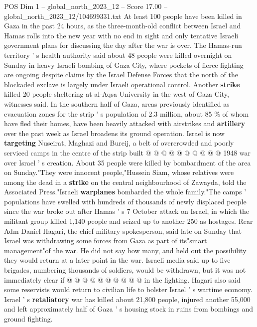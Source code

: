 \begin{textsample}{POS Dim 1 – global\_north\_2023\_12 – Score 17.00 – global\_north\_2023\_12/104699331.txt}  \label{ex:f1_pos_259}
At least 100 people have been killed in Gaza in the past 24 hours, as the three-month-old conflict between Israel and Hamas rolls into the new year with no end in sight and only tentative Israeli government plans for discussing the day after the war is over.
The Hamas-run territory ' s health authority said about 48 people were killed overnight on Sunday in heavy Israeli bombing of Gaza City, where pockets of fierce fighting are ongoing despite claims by the Israel Defense Forces that the north of the blockaded exclave is largely under Israeli operational control.
Another \textbf{strike} killed 20 people sheltering at al-Aqsa University in the west of Gaza City, witnesses said.
In the southern half of Gaza, areas previously identified as evacuation zones for the strip ' s population of 2.3 million, about 85 \% of whom have fled their homes, have been heavily attacked with airstrikes and \textbf{artillery} over the past week as Israel broadens its ground operation.
Israel is now \textbf{targeting} Nuseirat, Maghazi and Bureij, a belt of overcrowded and poorly serviced camps in the centre of the strip built @ @ @ @ @ @ @ @ @ @ 1948 war over Israel ' s creation.
About 35 people were killed by bombardment of the area on Sunday."They were innocent people,"Hussein Siam, whose relatives were among the dead in a \textbf{strike} on the central neighbourhood of Zawayda, told the Associated Press."Israeli \textbf{warplanes} bombarded the whole family."The camps ' populations have swelled with hundreds of thousands of newly displaced people since the war broke out after Hamas ' s 7 October attack on Israel, in which the militant group killed 1,140 people and seized up to another 250 as hostages.
Rear Adm Daniel Hagari, the chief military spokesperson, said late on Sunday that Israel was withdrawing some forces from Gaza as part of its"smart management"of the war.
He did not say how many, and held out the possibility they would return at a later point in the war.
Israeli media said up to five brigades, numbering thousands of soldiers, would be withdrawn, but it was not immediately clear if @ @ @ @ @ @ @ @ @ @ in the fighting.
Hagari also said some reservists would return to civilian life to bolster Israel ' s wartime economy.
Israel ' s \textbf{retaliatory} war has killed about 21,800 people, injured another 55,000 and left approximately half of Gaza ' s housing stock in ruins from bombings and ground fighting.

\end{textsample}
